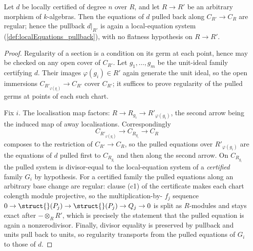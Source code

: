 \begin{theorem}
  \label{thm:isLocallyCertified_pullback_regular}
  \leanok
  Let \(d\) be locally certified of degree \(n\) over \(R\), and let \(R \to R'\) be an
  arbitrary morphism of \(k\)-algebras. Then the equations of \(d\) pulled back along
  \(C_{R'} \to C_R\) are regular; hence the pullback \(d|_{R'}\) is again a local-equation
  system (\ref{def:localEquations_pullback}), with no flatness hypothesis on \(R \to R'\).
\end{theorem}
\begin{proof}
  \leanok
  Regularity of a section is a condition on its germ at each point, hence may be checked on
  any open cover of \(C_{R'}\). Let \(g_1,\dots,g_m\) be the unit-ideal family certifying
  \(d\). Their images \(\varphi(g_i) \in R'\) again generate the unit ideal, so the open
  immersions \(C_{R'_{\varphi(g_i)}} \to C_{R'}\) cover \(C_{R'}\); it suffices to prove
  regularity of the pulled germs at points of each such chart.

  Fix \(i\). The localisation map factors: \(R \to R_{g_i} \to R'_{\varphi(g_i)}\), the
  second arrow being the induced map of away localisations. Correspondingly
  \[
    C_{R'_{\varphi(g_i)}} \longrightarrow C_{R_{g_i}} \longrightarrow C_R
  \]
  composes to the restriction of \(C_{R'} \to C_R\), so the pulled equations over
  \(R'_{\varphi(g_i)}\) are the equations of \(d\) pulled first to \(C_{R_{g_i}}\) and then
  along the second arrow. On \(C_{R_{g_i}}\) the pulled system is divisor-equal to the
  local-equation system of a \emph{certified} family \(G_i\) by hypothesis. For a certified
  family the pulled equations along an arbitrary base change are regular: clause (c1) of
  the certificate makes each chart colength module projective, so the multiplication-by-
  \(f_j\) sequence \(0 \to \struct{}(P_j) \to \struct{}(P_j) \to Q_j \to 0\) is split as
  \(R\)-modules and stays exact after \(- \otimes_R R'\), which is precisely the statement
  that the pulled equation is again a nonzerodivisor. Finally, divisor equality is
  preserved by pullback and units pull back to units, so regularity transports from the
  pulled equations of \(G_i\) to those of \(d\).
\end{proof}

